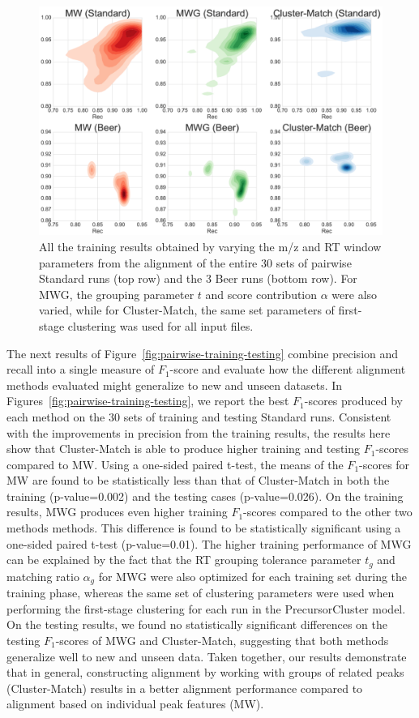 \begin{figure}[!htbp]
\centering
\centering\includegraphics[width=1.0\linewidth]{05-precursor-cluster/figures/fig2.pdf}
\caption{\label{fig:training-results} All the training results obtained by varying the m/z and RT window parameters from the alignment of the entire 30 sets of pairwise Standard runs (top row) and the 3 Beer runs (bottom row). For MWG, the grouping parameter $t$ and score contribution $\alpha$ were also varied, while for Cluster-Match, the same set parameters of first-stage clustering was used for all input files.}
\end{figure}

The next results of Figure~\ref{fig:pairwise-training-testing} combine precision and recall into a single measure of $F_1$-score and evaluate how the different alignment methods evaluated might generalize to new and unseen datasets. In Figures~\ref{fig:pairwise-training-testing}, we report the best $F_1$-scores produced by each method on the 30 sets of training and testing Standard runs. Consistent with the improvements in precision from the training results, the results here show that Cluster-Match is able to produce higher training and testing $F_1$-scores compared to MW. Using a one-sided paired t-test, the means of the $F_1$-scores for MW are found to be statistically less than that of Cluster-Match in both the training (p-value=0.002) and the testing cases (p-value=0.026). On the training results, MWG produces even higher training $F_1$-scores compared to the other two methods methods. This difference is found to be statistically significant using a one-sided paired t-test (p-value=0.01). The higher training performance of MWG can be explained by the fact that the RT grouping tolerance parameter $t_g$ and matching ratio $\alpha_g$ for MWG were also optimized for each training set during the training phase, whereas the same set of clustering parameters were used when performing the first-stage clustering for each run in the PrecursorCluster model. On the testing results, we found no statistically significant differences on the testing $F_1$-scores of MWG and Cluster-Match, suggesting that both methods generalize well to new and unseen data. Taken together, our results demonstrate that in general, constructing alignment by working with groups of related peaks (Cluster-Match) results in a better alignment performance compared to alignment based on individual peak features (MW).

